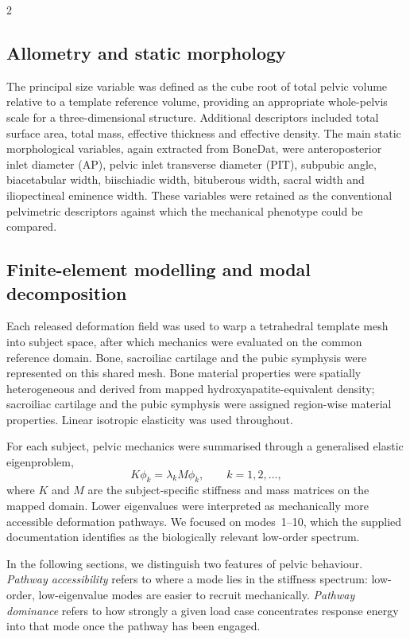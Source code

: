 \documentclass[openacc]{rsproca_new}
\begin{document}
\begin{multicols}{2}
\subsection{Allometry and static morphology}

The principal size variable was defined as the cube root of total pelvic volume relative to a template reference volume, providing an appropriate whole-pelvis scale for a three-dimensional structure. Additional descriptors included total surface area, total mass, effective thickness and effective density. The main static morphological variables, again extracted from BoneDat, were anteroposterior inlet diameter (AP), pelvic inlet transverse diameter (PIT), subpubic angle, biacetabular width, biischiadic width, bituberous width, sacral width and iliopectineal eminence width. These variables were retained as the conventional pelvimetric descriptors against which the mechanical phenotype could be compared.

\subsection{Finite-element modelling and modal decomposition}

Each released deformation field was used to warp a tetrahedral template mesh into subject space, after which mechanics were evaluated on the common reference domain. Bone, sacroiliac cartilage and the pubic symphysis were represented on this shared mesh. Bone material properties were spatially heterogeneous and derived from mapped hydroxyapatite-equivalent density; sacroiliac cartilage and the pubic symphysis were assigned region-wise material properties. Linear isotropic elasticity was used throughout.

For each subject, pelvic mechanics were summarised through a generalised elastic eigenproblem,
\begin{equation}
K\phi_{k} = \lambda_{k} M\phi_{k}, \qquad k=1,2,\ldots,
\end{equation}
where $K$ and $M$ are the subject-specific stiffness and mass matrices on the mapped domain. Lower eigenvalues were interpreted as mechanically more accessible deformation pathways. We focused on modes~1--10, which the supplied documentation identifies as the biologically relevant low-order spectrum.

In the following sections, we distinguish two features of pelvic behaviour. \emph{Pathway accessibility} refers to where a mode lies in the stiffness spectrum: low-order, low-eigenvalue modes are easier to recruit mechanically. \emph{Pathway dominance} refers to how strongly a given load case concentrates response energy into that mode once the pathway has been engaged.


\end{multicols}
\end{document}
